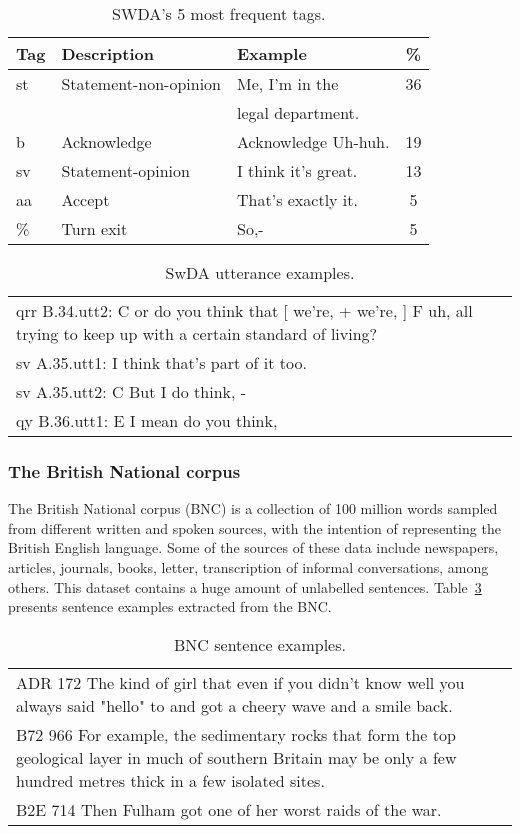 
\begin{table}[h]
\centering
\begin{tabular}{l l l c}
\hline
\textbf{Tag} & \textbf{Description} & \textbf{Example} & \textbf{\%}\\
\hline
st & Statement-non-opinion & Me, I'm in the & 36 \\
 & & legal department. & \\
b & Acknowledge & Acknowledge Uh-huh. & 19 \\
sv & Statement-opinion & I think it's great. & 13 \\
aa & Accept & That's exactly it. & 5 \\
\% & Turn exit & So,- & 5 \\
 \hline
\end{tabular}
\caption{SWDA's 5 most frequent tags.}
\label{tab:swda_tag_example}
\end{table}

\begin{table}[h]
\centering
\begin{tabular}{p{}}
\hline
qrr B.34.utt2: {C or } do you think that [ we're, + we're, ] {F uh, } all trying to keep up with a certain standard of living? \\
sv A.35.utt1: I think that's part of it too. \\
sv A.35.utt2: {C But } I do think, - \\
qy B.36.utt1: {E I mean } do you think, \\
\hline
\end{tabular}
\caption{SwDA utterance examples.}
\label{tab:swda_sent_example}
\end{table}

\subsubsection*{The British National corpus}
The British National corpus (BNC) is a collection of 100 million words sampled from different written and spoken sources, with the intention of representing the British English language. Some of the sources of these data include newspapers, articles, journals, books, letter, transcription of informal conversations, among others. This dataset contains a huge amount of unlabelled sentences.
Table~\ref{tab:bnc_sent_example} presents sentence examples extracted from the BNC.

\begin{table}[h]
\centering
\begin{tabular}{p{}}
\hline
ADR 172 The kind of girl that even if you didn't know well you always said "hello" to and got a cheery wave and a smile back. \\
B72 966 For example, the sedimentary rocks that form the top geological layer in much of southern Britain may be only a few hundred metres thick in a few isolated sites. \\
B2E 714 Then Fulham got one of her worst raids of the war. \\
 \hline
\end{tabular}
\caption{BNC sentence examples.}
\label{tab:bnc_sent_example}
\end{table}

